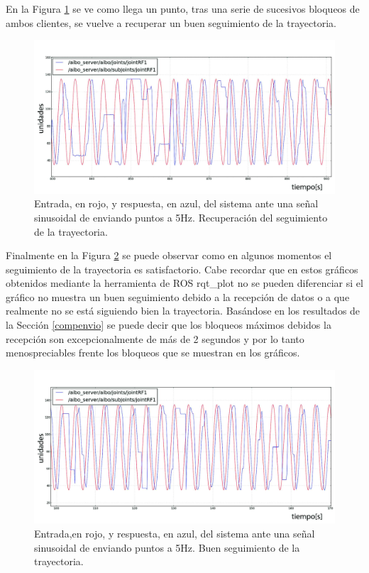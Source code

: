 \documentclass[12pt,a4paper,final,twoside]{book}
\begin{document}
En la Figura \ref{fig:ASrecupera} se ve como llega un punto, tras una serie de sucesivos bloqueos de ambos clientes, se vuelve a recuperar un buen seguimiento de la trayectoria.
 
\begin{figure}[H]
	\centering
    \includegraphics[scale=0.2]{images/recupera.jpg}
 	\caption{Entrada, en rojo, y respuesta, en azul, del sistema ante una señal sinusoidal de enviando puntos a 5Hz. Recuperación del seguimiento de la trayectoria.}
  \label{fig:ASrecupera}
\end{figure}

Finalmente en la Figura \ref{fig:ASbuena} se puede observar como en algunos momentos el seguimiento de la trayectoria es satisfactorio. Cabe recordar que en estos gráficos obtenidos mediante la herramienta de ROS rqt{\_}plot no se pueden diferenciar si el gráfico no muestra un buen seguimiento debido a la recepción de datos o a que realmente no se está siguiendo bien la trayectoria. Basándose en los resultados de la Sección \ref{compenvio} se puede decir que los bloqueos máximos debidos la recepción son excepcionalmente de más de 2 segundos y por lo tanto menospreciables frente los bloqueos que se muestran en los gráficos.
 \begin{figure}[H]
	\centering
    \includegraphics[scale=0.2]{images/mejor5hz.jpg}
 	\caption{Entrada,en rojo, y respuesta, en azul, del sistema ante una señal sinusoidal de enviando puntos a 5Hz. Buen seguimiento de la trayectoria.}
  \label{fig:ASbuena}
\end{figure}
\end{document}
